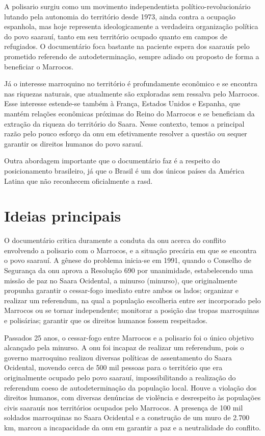 	A \gls{polisario} surgiu como um movimento independentista político-revolucionário lutando pela autonomia do território desde 1973, ainda contra a ocupação espanhola, mas hoje representa ideologicamente a verdadeira organização política do povo saarauí, tanto em seu território ocupado quanto em campos de refugiados. O documentário foca bastante na paciente espera dos saarauís pelo prometido referendo de autodeterminação, sempre adiado ou proposto de forma a beneficiar o Marrocos.
	
	Já o interesse marroquino no território é profundamente econômico e se encontra nas riquezas naturais, que atualmente são exploradas sem ressalva pelo Marrocos. Esse interesse estende-se também à França, Estados Unidos e Espanha, que mantém relações econômicas próximas do Reino do Marrocos e se beneficiam da extração da riqueza do território do Saara. Nesse contexto, temos a principal razão pelo pouco esforço da \gls{onu} em efetivamente resolver a questão ou sequer garantir os direitos humanos do povo sarauí.
	
	Outra abordagem importante que o documentário faz é a respeito do posicionamento brasileiro, já que o Brasil é um dos únicos países da América Latina que não reconhecem oficialmente a \glsdesc{rasd}.
	
	\section{Ideias principais} \label{sec:ideias_principais}
	
	O documentário critica duramente a conduta da \glsdesc{onu} acerca do conflito envolvendo a \gls{polisario} com o Marrocos, e a situação precária em que se encontra o povo saarauí. A gênese do problema inicia-se em  1991, quando o Conselho de Segurança da \gls{onu} aprova a Resolução 690 por unanimidade, estabelecendo uma missão de paz no Saara Ocidental, a \glsdesc{minurso} (\gls{minurso}), que originalmente propunha garantir o cessar-fogo imediato entre ambos os lados; organizar e realizar um referendum, na qual a população escolheria entre ser incorporado pelo Marrocos ou se tornar independente; monitorar a posição das tropas marroquinas e polisárias; garantir que os direitos humanos fossem respeitados.
	
	Passados 25 anos, o cessar-fogo entre Marrocos e a \gls{polisario} foi o único objetivo alcançado pela \gls{minurso}. A \gls{onu} foi incapaz de realizar um referendum, pois o governo marroquino realizou diversas políticas de assentamento do Saara Ocidental, movendo cerca de 500 mil pessoas para o território que era originalmente ocupado pelo povo saarauí, impossibilitando a realização do referendum coeso de autodeterminação da população local. Houve a violação dos direitos humanos, com diversas denúncias de violência e desrespeito às populações civis saarauís nos territórios ocupados pelo Marrocos. A presença de 100 mil soldados marroquinas no Saara Ocidental e a construção de um muro de 2.700 km, marcou a incapacidade da \glsdesc{onu} em garantir a paz e a neutralidade do conflito.
	
